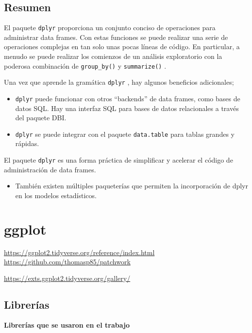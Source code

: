 \documentclass[
]{book}
\providecommand{\tightlist}{%
  \setlength{\itemsep}{0pt}\setlength{\parskip}{0pt}}
\begin{document}
\hypertarget{resumen}{%
\section{Resumen}\label{resumen}}

El paquete \texttt{dplyr} proporciona un conjunto conciso de operaciones para administrar data frames. Con estas funciones se puede realizar una serie de operaciones complejas en tan solo unas pocas líneas de código. En particular, a menudo se puede realizar los comienzos de un análisis exploratorio con la poderosa combinación de \texttt{group\_by()} y \texttt{summarize()} .

Una vez que aprende la gramática \texttt{dplyr} , hay algunos beneficios adicionales;

\begin{itemize}
\item
  \texttt{dplyr} puede funcionar con otros ``backends'' de data frames, como bases de datos SQL. Hay una interfaz SQL para bases de datos relacionales a través del paquete DBI.
\item
  \texttt{dplyr} se puede integrar con el paquete \texttt{data.table} para tablas grandes y rápidas.
\end{itemize}

El paquete \texttt{dplyr} es una forma práctica de simplificar y acelerar el código de administración de data frames.

\begin{itemize}
\tightlist
\item
  También existen múltiples paqueterías que permiten la incorporación de dplyr en los modelos estadísticos.
\end{itemize}

\hypertarget{ggplot}{%
\chapter{ggplot}\label{ggplot}}

\url{https://ggplot2.tidyverse.org/reference/index.html}
\url{https://github.com/thomasp85/patchwork}

\url{https://exts.ggplot2.tidyverse.org/gallery/}

\hypertarget{libreruxedas}{%
\section{Librerías}\label{libreruxedas}}

\textbf{Librerías que se usaron en el trabajo}
\end{document}
